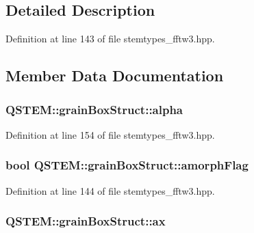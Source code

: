 \subsection{Detailed Description}


Definition at line 143 of file stemtypes\-\_\-fftw3.\-hpp.



\subsection{Member Data Documentation}
\hypertarget{struct_q_s_t_e_m_1_1grain_box_struct_a40806b2f4e13998f1373b043894eedbb}{
\subsubsection[{alpha}]{ Q\-S\-T\-E\-M\-::grain\-Box\-Struct\-::alpha}}\label{struct_q_s_t_e_m_1_1grain_box_struct_a40806b2f4e13998f1373b043894eedbb}


Definition at line 154 of file stemtypes\-\_\-fftw3.\-hpp.

\hypertarget{struct_q_s_t_e_m_1_1grain_box_struct_a372559d76e6431c06cfc581141906b3b}{
\subsubsection[{amorph\-Flag}]{\setlength{\rightskip}{0pt plus 5cm}bool Q\-S\-T\-E\-M\-::grain\-Box\-Struct\-::amorph\-Flag}}\label{struct_q_s_t_e_m_1_1grain_box_struct_a372559d76e6431c06cfc581141906b3b}


Definition at line 144 of file stemtypes\-\_\-fftw3.\-hpp.

\hypertarget{struct_q_s_t_e_m_1_1grain_box_struct_a1c10aa68c1ef6cccabd18ee3c66a1a36}{
\subsubsection[{ax}]{ Q\-S\-T\-E\-M\-::grain\-Box\-Struct\-::ax}}\label{struct_q_s_t_e_m_1_1grain_box_struct_a1c10aa68c1ef6cccabd18ee3c66a1a36}


